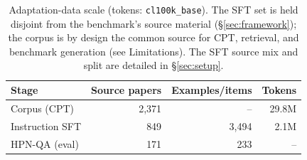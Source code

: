 \begin{table}[t]\centering\footnotesize
\caption{Adaptation-data scale (tokens: \texttt{cl100k\_base}). The SFT set is held disjoint from the benchmark's source material (\S\ref{sec:framework}); the corpus is by design the common source for CPT, retrieval, and benchmark generation (see Limitations). The SFT source mix and split are detailed in \S\ref{sec:setup}.}
\label{tab:traindata}
\setlength{\tabcolsep}{4pt}
\begin{tabular}{@{}lrrr@{}}
\toprule
Stage & Source papers & Examples/items & Tokens \\ \midrule
Corpus (CPT) & 2,371 & -- & 29.8M \\
Instruction SFT & 849 & 3,494 & 2.1M \\
HPN-QA (eval) & 171 & 233 & -- \\
\bottomrule
\end{tabular}
\end{table}
